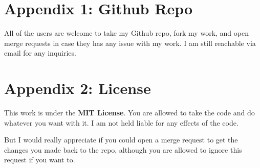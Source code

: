 
\section*{Appendix 1: Github Repo}

All of the users are welcome to take my Github repo\cite{github}, fork my work, and open merge requests in case they has any issue with my work. I am still reachable via email for any inquiries.

\section*{Appendix 2: License}

This work is under the \textbf{MIT License}. You are allowed to take the code and do whatever you want with it. I am not held liable for any effects of the code.

But I would really appreciate if you could open a merge request to get the changes you made back to the repo, although you are allowed to ignore this request if you want to.